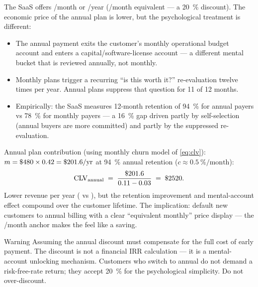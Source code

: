 \begin{example}
The SaaS offers /month or /year (/month equivalent --- a \qty{20}{\percent} discount). The economic price of the annual plan is lower, but the psychological treatment is different:

\begin{itemize}
  \item The  annual payment exits the customer's monthly operational budget account and enters a capital/software-license account --- a different mental bucket that is reviewed annually, not monthly.
  \item Monthly plans trigger a recurring ``is this worth it?'' re-evaluation twelve times per year. Annual plans suppress that question for 11 of 12 months.
  \item Empirically: the SaaS measures 12-month retention of \qty{94}{\percent} for annual payers vs \qty{78}{\percent} for monthly payers --- a \qty{16}{\percent} gap driven partly by self-selection (annual buyers are more committed) and partly by the suppressed re-evaluation.
\end{itemize}

Annual plan contribution (using monthly churn model of \cref{eq:clv}): \(m = \$\num{480} \times 0.42 = \$\num{201.6}/\text{yr}\) at \qty{94}{\percent} annual retention (\(c \approx \qty{0.5}{\percent}/\text{month}\)):
\[
  \mathrm{CLV}_{\text{annual}} \;=\; \frac{\$\num{201.6}}{0.11 - 0.03} \;=\; \$\num{2520}.
\]
Lower revenue per year ( vs ), but the retention improvement and mental-account effect compound over the customer lifetime. The implication: default new customers to annual billing with a clear ``equivalent monthly'' price display --- the /month anchor makes the  feel like a saving.
\end{example}

\begin{admonition}{Warning}
Assuming the annual discount must compensate for the full cost of early payment. The discount is not a financial IRR calculation --- it is a mental-account unlocking mechanism. Customers who switch to annual do not demand a risk-free-rate return; they accept \qty{20}{\percent} for the psychological simplicity. Do not over-discount.
\end{admonition}

